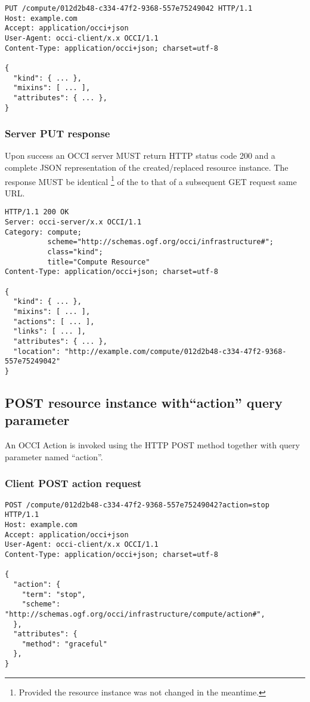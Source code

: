 \documentclass[10pt,a4paper]{article}
\begin{document}

\begin{verbatim}
PUT /compute/012d2b48-c334-47f2-9368-557e75249042 HTTP/1.1
Host: example.com
Accept: application/occi+json
User-Agent: occi-client/x.x OCCI/1.1
Content-Type: application/occi+json; charset=utf-8

{
  "kind": { ... },
  "mixins": [ ... ],
  "attributes": { ... },
}
\end{verbatim}

\subsubsection{Server PUT response}
Upon success an OCCI server MUST return HTTP status code 200 and a complete
JSON representation of the created/replaced resource instance. The response MUST
be identical%
\footnote{Provided the resource instance was not changed in the meantime.} of the
to that of a subsequent GET request same URL.

\begin{verbatim}
HTTP/1.1 200 OK
Server: occi-server/x.x OCCI/1.1
Category: compute;
          scheme="http://schemas.ogf.org/occi/infrastructure#";
          class="kind";
          title="Compute Resource"
Content-Type: application/occi+json; charset=utf-8

{
  "kind": { ... },
  "mixins": [ ... ],
  "actions": [ ... ],
  "links": [ ... ],
  "attributes": { ... },
  "location": "http://example.com/compute/012d2b48-c334-47f2-9368-557e75249042"
}
\end{verbatim}

\subsection{POST resource instance with``action'' query parameter}
An OCCI Action is invoked using the HTTP POST method together with query
parameter named ``action''.

\subsubsection{Client POST action request}
\begin{verbatim}
POST /compute/012d2b48-c334-47f2-9368-557e75249042?action=stop HTTP/1.1
Host: example.com
Accept: application/occi+json
User-Agent: occi-client/x.x OCCI/1.1
Content-Type: application/occi+json; charset=utf-8

{
  "action": {
    "term": "stop",
    "scheme": "http://schemas.ogf.org/occi/infrastructure/compute/action#",
  },
  "attributes": {
    "method": "graceful"
  },
}
\end{verbatim}
\end{document}
